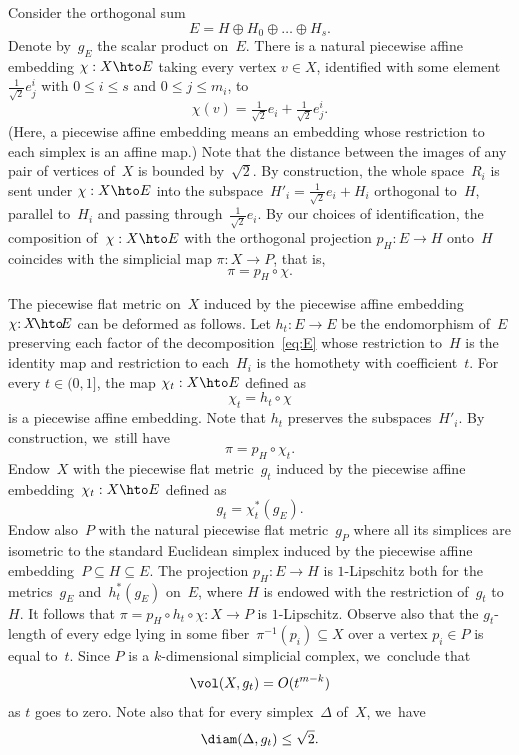Consider the orthogonal sum
\begin{equation} \label{eq:E}
E = H \oplus H_0 \oplus \dots \oplus H_s.
\end{equation}
Denote by~$g_E$ the scalar product on~$E$.
There is a natural piecewise affine embedding $\chi:X \hto E$ taking every vertex $v \in X$, identified with some element $\frac{1}{\sqrt{2}} e_j^i$ with $0 \leq i \leq s$ and $0 \leq j \leq m_i$, to
\[
\chi(v) = \tfrac{1}{\sqrt{2}} e_i + \tfrac{1}{\sqrt{2}} e_j^i.
\]
(Here, a piecewise affine embedding means an embedding whose restriction to each simplex is an affine map.)
Note that the distance between the images of any pair of vertices of~$X$ is bounded by~$\sqrt{2}$.
By construction, the whole space~$R_i$ is sent under $\chi:X \hto E$ into the subspace~$H'_i = \frac{1}{\sqrt{2}} e_i + H_i$ orthogonal to~$H$, parallel to~$H_i$ and passing through~$\frac{1}{\sqrt{2}} e_i$.
By our choices of identification, the composition of~$\chi: X \hto E$ with the orthogonal projection $p_H:E \to H$ onto~$H$ coincides with the simplicial map $\pi:X \to P$, that is,
\[
\pi = p_H \circ \chi.
\]

The piecewise flat metric on~$X$ induced by the piecewise affine embedding \hbox{$\chi{:}\, X\!\hto\! E$} can be deformed as follows.
Let $h_t:E \to E$ be the endomorphism of~$E$ preserving each factor of the decomposition~\eqref{eq:E} whose restriction to~$H$ is the identity map and restriction to each~$H_i$ is the homothety with coefficient~$t$.
For every $t \in (0,1]$, the map $\chi_t: X \hto E$ defined as
\[
\chi_t = h_t \circ \chi
\]
is a piecewise affine embedding.
Note that $h_t$ preserves the subspaces~$H'_i$.
By construction, we~still have
\[
\pi = p_H \circ \chi_t.
\]
Endow~$X$ with the piecewise flat metric~$g_t$ induced by the piecewise affine embedding~$\chi_t: X \hto E$ defined as
\begin{equation} \label{eq:gt}
g_t = \chi_t^* (g_E).
\end{equation}
Endow also~$P$ with the natural piecewise flat metric~$g_P$ where all its simplices are isometric to the standard Euclidean simplex induced by the piecewise affine embedding~$P \subseteq H \subseteq E$.
The projection $p_H:E \to H$ is $1$-Lipschitz both for the metrics~$g_E$ and~$h_t^*(g_E)$ on~$E$, where $H$ is endowed with the restriction of~$g_t$ to~$H$.
It follows that $\pi=p_H \circ h_t \circ \chi:X \to P$ is $1$-Lipschitz.
Observe also that the $g_t$-length of every edge lying in some fiber~$\pi^{-1}(p_i) \subseteq X$ over a vertex $p_i \in P$ is equal to~$t$.
Since $P$ is a $k$-dimensional simplicial complex, we~conclude that
\begin{equation} \label{eq:volt}
\vol(X,g_t) = O(t^{m-k})
\end{equation}
as $t$ goes to zero.
Note also that for every simplex~$\Delta$ of~$X$, we~have
\begin{equation} \label{eq:diamgt}
\diam(\Delta,g_t) \leq \sqrt{2}.
\end{equation}

